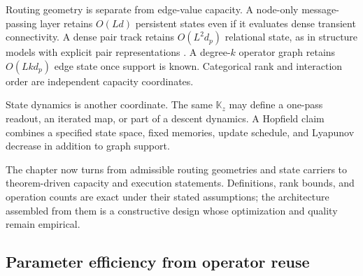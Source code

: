 \documentclass[10pt]{article}
\theoremstyle{definition}
\theoremstyle{remark}
\newcommand{\BookSection}[1]{\subsection{#1}}
\begin{document}
Routing geometry is separate from edge-value capacity.  A node-only message-passing layer retains
$O(Ld)$ persistent states even if it evaluates dense transient connectivity.  A dense pair track
retains $O(L^2d_p)$ relational state, as in structure models with explicit pair representations
\cite{jumper2021}.  A degree-$k$ operator graph retains $O(Lkd_p)$ edge state once support is
known.  Categorical rank and interaction order are independent capacity coordinates.

State dynamics is another coordinate.  The same $\mathbb K_z$ may define a one-pass readout,
an iterated map, or part of a descent dynamics.  A Hopfield claim combines a specified state space,
fixed memories, update schedule, and Lyapunov decrease in addition to graph support.

\ifdefined\BOOKMODE
The chapter now turns from admissible routing geometries and state carriers to theorem-driven
capacity and execution statements.  Definitions, rank bounds, and operation counts are exact under
their stated assumptions; the architecture assembled from them is a constructive design whose
optimization and quality remain empirical.
\fi
\BookSection{Parameter efficiency from operator reuse}
\end{document}
